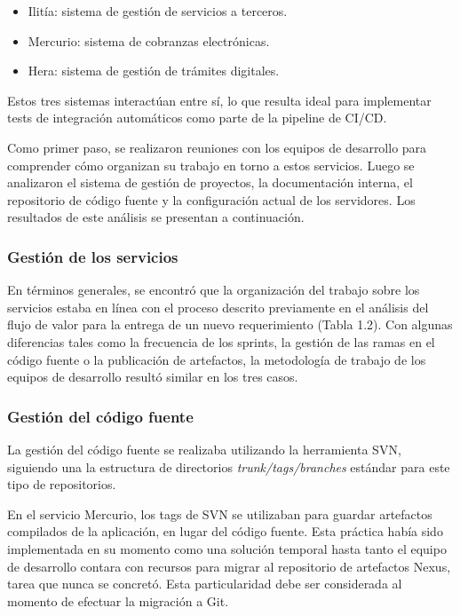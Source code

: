 \begin{itemize}
\item Ilitía: sistema de gestión de servicios a terceros.
\item Mercurio: sistema de cobranzas electrónicas.
\item Hera: sistema de gestión de trámites digitales.
\end{itemize}
Estos tres sistemas interactúan entre sí, lo que resulta ideal para implementar tests de integración automáticos como parte de la pipeline de CI/CD.

Como primer paso, se realizaron reuniones con los equipos de desarrollo para comprender cómo organizan su trabajo en torno a estos servicios. Luego se analizaron el sistema de gestión de proyectos, la documentación interna, el repositorio de código fuente y la configuración actual de los servidores. Los resultados de este análisis se presentan a continuación.

\subsubsection{Gestión de los servicios}

En términos generales, se encontró que la organización del trabajo sobre los servicios estaba en línea con el proceso descrito previamente en el análisis del flujo de valor para la entrega de un nuevo requerimiento (Tabla 1.2). Con algunas diferencias tales como la frecuencia de los sprints, la gestión de las ramas en el código fuente o la publicación de artefactos, la metodología de trabajo de los equipos de desarrollo resultó similar en los tres casos.

\subsubsection{Gestión del código fuente}

La gestión del código fuente se realizaba utilizando la herramienta SVN, siguiendo una la estructura de directorios \textit{trunk/tags/branches} estándar para este tipo de repositorios.

En el servicio Mercurio, los tags de SVN se utilizaban para guardar artefactos compilados de la aplicación, en lugar del código fuente. Esta práctica había sido implementada en su momento como una solución temporal hasta tanto el equipo de desarrollo contara con recursos para migrar al repositorio de artefactos Nexus, tarea que nunca se concretó. Esta particularidad debe ser considerada al momento de efectuar la migración a Git.

